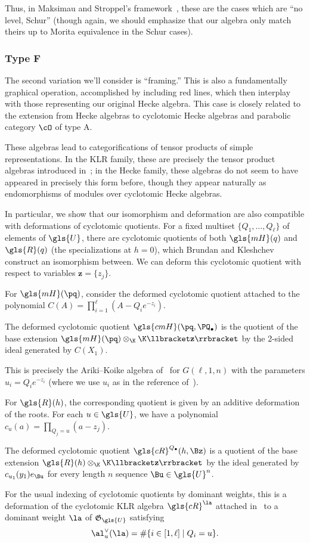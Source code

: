  Thus, in Maksimau and Stroppel's framework~\cite{MS18}, these are the cases which are
 ``no level, Schur'' (though again, we should emphasize that our
 algebra only match theirs up to Morita equivalence in the Schur
 cases). 

\subsubsection*{Type F}
The second variation we'll consider is ``framing.'' This is also a
fundamentally graphical operation, accomplished by including red lines, which
then interplay with those representing our original Hecke algebra.
This case is closely related to the extension from Hecke algebras to
cyclotomic Hecke algebras and parabolic category $\cO$ of type A.

These algebras lead to categorifications of tensor products of simple
representations. 
In the KLR family, these are precisely the tensor
product algebras introduced in~\cite[Def.~4.7]{Webmerged}; in the Hecke family,
these algebras do not seem to have appeared in precisely this form
before, though they appear naturally as endomorphisms of modules
over cyclotomic Hecke algebras.

In particular, we show that our isomorphism and deformation are also compatible with
 deformations of cyclotomic quotients. 
For a fixed multiset $\{Q_1,\dots, Q_\ell\}$ of elements of $\gls{U}$, there are cyclotomic quotients of both
 $\gls{mH}(q)$ and $\gls{R}(q)$ (the specializations at $h=0$), which Brundan and Kleshchev construct an
 isomorphism between. We can deform this cyclotomic quotient with
 respect to variables $\mathbf{z}=\{z_{j}\}$.

For $\gls{mH}(\pq)$, consider the
deformed cyclotomic quotient attached to the 
polynomial 
\mbox{$C(A)= \prod_{i=1}^\ell
(A-Q_ie^{-z_i}).$} 
\begin{defi}\label{def:cmH}
 The deformed cyclotomic quotient $\gls{cmH}(\pq,\PQ_\bullet)$ is the quotient
 of the base extension $\gls{mH}(\pq)\otimes_\K\K\llbracket \mathbf{z}\rrbracket $ by the
 2-sided ideal generated by $C(X_1)$.
\end{defi}
This is precisely the Ariki--Koike algebra of~\cite[Def.~3.1]{AK} for
$G(\ell,1,n)$ with the parameters $u_i=Q_ie^{-z_i}$ (where we use $u_i$ as in the reference
of~\cite{AK}).


For $\gls{R}(h)$, the corresponding quotient is given by an additive
deformation of the roots. For each $u\in \gls{U}$, we have a
polynomial $c_u(a)=\prod_{Q_j=u}(a-z_{j})$.
\begin{defi}\label{def:cR}
 The deformed cyclotomic quotient $\gls{cR}^{Q_\bullet}(h,\Bz)$ is a quotient of
 the base extension $\gls{R}(h)\otimes_\K\K\llbracket \mathbf{z}\rrbracket $ by the ideal
 generated by $c_{u_1}(y_1)e_\Bu$ for every length $n$ sequence
 $\Bu\in \gls{U}^n$.
\end{defi}
For the usual indexing of cyclotomic quotients by dominant weights,
this is a deformation of the cyclotomic KLR algebra $\gls{cR}^\la$ attached in~\cite{KLI} to a
dominant weight $\la$ of $\mathfrak{G}_{\gls{U}}$ satisfying
\[\al_u^\vee(\la)=\#\{i\in [1,\ell]\mid Q_i=u\}.\]


